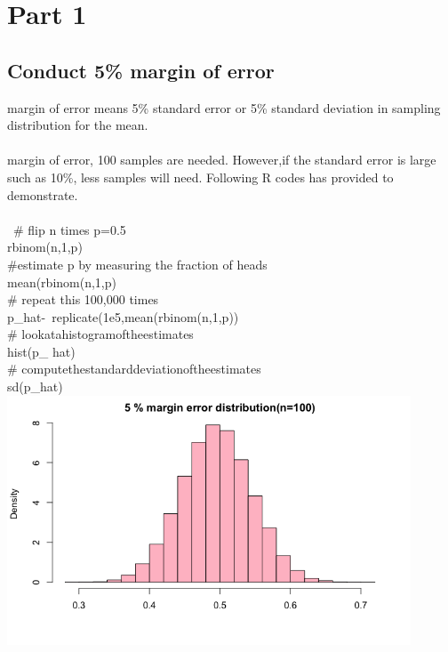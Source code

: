 \section{Part 1}
\subsection{Conduct 5\% margin of error}
\begin{documents}
 margin of error means 5\% standard error or 5\% standard deviation in sampling distribution for the mean.
\\\\
 margin of error, 100 samples are needed. However,if the standard error is large such as 10\%, less samples will need. Following R codes has provided to demonstrate.\\\\
\ \# flip n times p=0.5
\\rbinom(n,1,p)\\
\#estimate p by measuring the fraction of heads \\
mean(rbinom(n,1,p)\\
\# repeat this 100,000 times\\
 p\_hat\<-\ replicate(1e5,mean(rbinom(n,1,p))\\
 \# look\enspace at\enspace a\enspace histogram\enspace of\enspace the\enspace estimates\\
 hist(p\_ hat)\\
 \# compute\enspace the\enspace standard\enspace deviation\enspace of\enspace the\enspace estimates\\
sd(p\_hat)\\


\includegraphics[width=12cm]{figures/ddg}

\end{documents}

